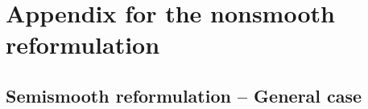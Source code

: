 \documentclass[11pt, a4paper]{article}
\begin{document}
%
%
%
%


\section{Appendix for the nonsmooth reformulation}

\subsection{Semismooth reformulation -- General case\label{app:nseq:gencase}}
\end{document}
